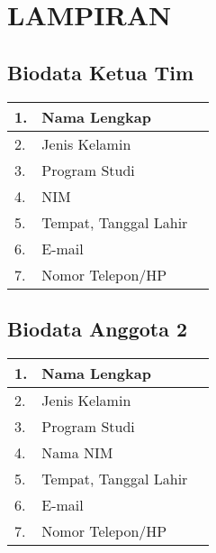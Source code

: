 \section*{\centering LAMPIRAN}
\setcounter{section}{1}
\setcounter{subsection}{0}
\subsection{Biodata Ketua Tim}
\renewcommand{\arraystretch}{1.5}
\quad \begin{tabular}{|m{}|m{}|m{}|}
\hline
1. & Nama Lengkap &  \\
\hline
2. & Jenis Kelamin & \\
\hline
3. & Program Studi &  \\
\hline
4. & NIM & \\
\hline
5. & Tempat, Tanggal Lahir & \\
\hline
6. & E-mail &  \\
\hline
7. & Nomor Telepon/HP &  \\
\hline
\end{tabular}

\subsection{Biodata Anggota 2}
\renewcommand{\arraystretch}{1.5}
\quad \begin{tabular}{|m{}|m{}|m{}|}
\hline
1. & Nama Lengkap &  \\
\hline
2. & Jenis Kelamin & \\
\hline
3. & Program Studi &  \\
\hline
4. & Nama NIM &  \\
\hline
5. & Tempat, Tanggal Lahir &  \\
\hline
6. & E-mail &  \\
\hline
7. & Nomor Telepon/HP & \\
\hline
\end{tabular}

